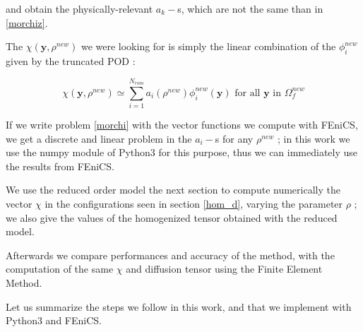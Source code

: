 and obtain the physically-relevant $a_k -$s, which are not the same than in \ref{morchiz}.

\par
The $\chi(\mathbf{y},\rho^{new})$ we were looking for is simply the linear combination of the $\phi_i^{new}$ given by the truncated POD :

\begin{equation}\label{newrom}
\chi\left(\mathbf{y},\rho^{new}\right)\simeq \sum\limits_{i=1}^{N_{rom}} a_i \left(\rho^{new}\right)\phi_i^{new}(\mathbf{y})\text{ for all $\mathbf{y}$ in $\Omega_f^{new}$}
\end{equation}

\par
If we write problem \ref{morchi} with the vector functions we compute with FEniCS, %
we get a discrete and linear problem in the $a_i-$s for any $\rho^{new}$ ; %
in this work we use the numpy module of Python3 for this purpose, thus we can immediately use the results from FEniCS.

\par
We use the reduced order model the next section to compute numerically the vector $\chi$ in the configurations seen in section \ref{hom_d}, %
varying the parameter $\rho$ ; we also give the values of the homogenized tensor obtained with the reduced model.

\par
Afterwards we compare performances and accuracy of the method, with the computation of the same $\chi$ and diffusion tensor using the Finite Element Method.

\par
Let us summarize the steps we follow in this work, and that we implement with Python3 and FEniCS.

